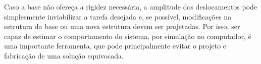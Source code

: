 Caso a base não ofereça a rigidez necessária, a amplitude dos deslocamentos pode
simplesmente inviabilizar a tarefa desejada e, se possível, modificações na
estrutura da base ou uma nova estrutura devem ser projetadas. Por isso, ser
capaz de estimar o comportamento do sistema, por simulação no computador, é uma
importante ferramenta, que pode principalmente evitar o projeto e fabricação de
uma solução equivocada.


% 
% 
% 



